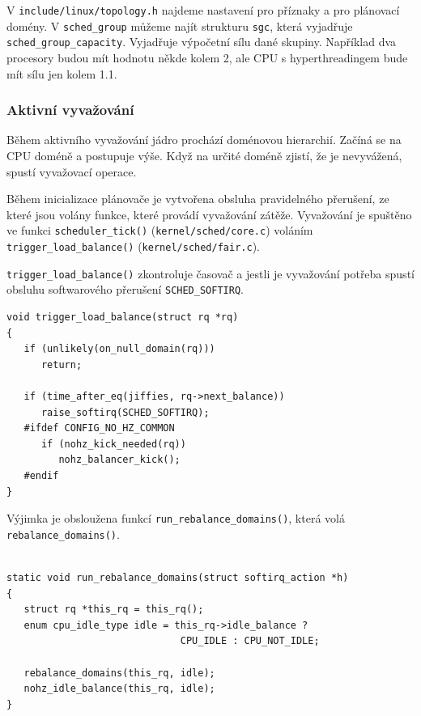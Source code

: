 \documentclass[
  master=true,
  font=sans,
  printversion=false,
  joinlists=true,
  figures=true,
  tables=true,
  sourcecodes=false,
  theorems=false,
  bibencoding=utf8,
  language=czech,
  encoding=utf8,
  field=ainfk,
  biblatex,
  glossaries,
  index
]{kidiplom}
\begin{document}
V \verb#include/linux/topology.h# najdeme nastavení pro příznaky a pro plánovací domény. V \verb#sched_group# můžeme najít strukturu \verb#sgc#, která vyjadřuje \verb#sched_group_capacity#. Vyjadřuje výpočetní sílu dané skupiny. Například dva procesory budou mít hodnotu někde kolem 2, ale CPU s hyperthreadingem bude mít sílu jen kolem 1.1. 

\subsubsection{Aktivní vyvažování}

Během aktivního vyvažování jádro prochází doménovou hierarchií. Začíná se na CPU doméně a postupuje výše. Když na určité doméně zjistí, že je nevyvážená, spustí vyvažovací operace.

Během inicializace plánovače je vytvořena obsluha pravidelného přerušení, ze které jsou volány funkce, které provádí vyvažování zátěže. Vyvažování je spuštěno ve funkci \verb#scheduler_tick()# (\verb#kernel/sched/core.c#) voláním \linebreak \verb#trigger_load_balance()# (\verb#kernel/sched/fair.c#). 

\verb#trigger_load_balance()# zkontroluje časovač a jestli je vyvažování potřeba spustí obsluhu softwarového přerušení \verb#SCHED_SOFTIRQ#.

\newpage
\begin{verbatim} 
void trigger_load_balance(struct rq *rq)
{
   if (unlikely(on_null_domain(rq)))
      return;

   if (time_after_eq(jiffies, rq->next_balance))
      raise_softirq(SCHED_SOFTIRQ);
   #ifdef CONFIG_NO_HZ_COMMON
      if (nohz_kick_needed(rq))
         nohz_balancer_kick();
   #endif
}
\end{verbatim} 

Výjimka je obsloužena funkcí \verb#run_rebalance_domains()#, která volá \linebreak \verb#rebalance_domains()#. 

\begin{verbatim} 

static void run_rebalance_domains(struct softirq_action *h)
{
   struct rq *this_rq = this_rq();
   enum cpu_idle_type idle = this_rq->idle_balance ?
                              CPU_IDLE : CPU_NOT_IDLE;

   rebalance_domains(this_rq, idle);
   nohz_idle_balance(this_rq, idle);
}

\end{verbatim} 
\end{document}
